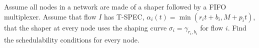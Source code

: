 \begin{problem}
Assume all nodes in a network are made of a shaper followed by a
FIFO multiplexer. Assume that flow $I$ has T-SPEC,
$\alpha_i(t)=\min(r_it+b_i, M+p_it)$, that the shaper at every
node uses the shaping curve $\sigma_i=\gamma_{r_i,b_i}$ for flow
$i$. Find the schedulability conditions for every node.
\end{problem}
